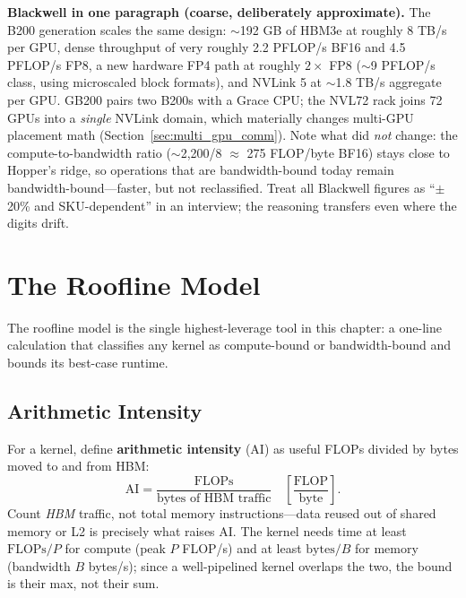 \textbf{Blackwell in one paragraph (coarse, deliberately approximate).} The B200 generation scales the same design: $\sim$192 GB of HBM3e at roughly 8 TB/s per GPU, dense throughput of very roughly 2.2 PFLOP/s BF16 and 4.5 PFLOP/s FP8, a new hardware FP4 path at roughly $2\times$ FP8 ($\sim$9 PFLOP/s class, using microscaled block formats), and NVLink 5 at $\sim$1.8 TB/s aggregate per GPU. GB200 pairs two B200s with a Grace CPU; the NVL72 rack joins 72 GPUs into a \textit{single} NVLink domain, which materially changes multi-GPU placement math (Section~\ref{sec:multi_gpu_comm}). Note what did \textit{not} change: the compute-to-bandwidth ratio ($\sim$2{,}200/8 $\approx$ 275 FLOP/byte BF16) stays close to Hopper's ridge, so operations that are bandwidth-bound today remain bandwidth-bound---faster, but not reclassified. Treat all Blackwell figures as ``$\pm$20\% and SKU-dependent'' in an interview; the reasoning transfers even where the digits drift.

\section{The Roofline Model}
\label{sec:roofline}

The roofline model is the single highest-leverage tool in this chapter: a one-line calculation that classifies any kernel as compute-bound or bandwidth-bound and bounds its best-case runtime.

\subsection{Arithmetic Intensity}

For a kernel, define \textbf{arithmetic intensity} (AI) as useful FLOPs divided by bytes moved to and from HBM:
\begin{equation}
\text{AI} = \frac{\text{FLOPs}}{\text{bytes of HBM traffic}} \quad \left[\frac{\text{FLOP}}{\text{byte}}\right].
\end{equation}
Count \textit{HBM} traffic, not total memory instructions---data reused out of shared memory or L2 is precisely what raises AI. The kernel needs time at least $\text{FLOPs}/P$ for compute (peak $P$ FLOP/s) and at least $\text{bytes}/B$ for memory (bandwidth $B$ bytes/s); since a well-pipelined kernel overlaps the two, the bound is their max, not their sum.

